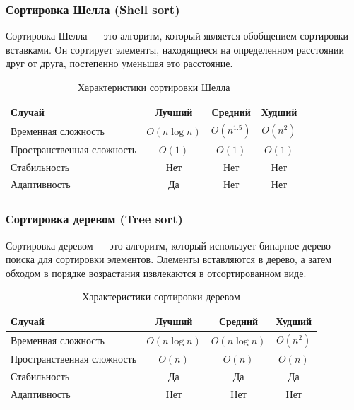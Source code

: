 \documentclass[a4paper,12pt]{article}
\begin{document}
\subsubsection{Сортировка Шелла (Shell sort)}
\label{subsubsec:сортировка-шелла-shell-sort}

Сортировка Шелла --- это алгоритм, который является обобщением сортировки вставками. Он сортирует элементы, находящиеся на определенном расстоянии друг от друга, постепенно уменьшая это расстояние.

\begin{table}[H]
    \centering
    \begin{tabular}{|l|c|c|c|}
        \hline
        Случай & Лучший & Средний & Худший \\
        \hline
        Временная сложность & $O(n \log n)$ & $O(n^{1.5})$ & $O(n^2)$ \\
        \hline
        Пространственная сложность & $O(1)$ & $O(1)$ & $O(1)$ \\
        \hline
        Стабильность & Нет & Нет & Нет \\
        \hline
        Адаптивность & Да & Нет & Нет \\
        \hline
    \end{tabular}
    \caption{Характеристики сортировки Шелла}
\end{table}

\subsubsection{Сортировка деревом (Tree sort)}
\label{subsubsec:сортировка-деревом-tree-sort}

Сортировка деревом --- это алгоритм, который использует бинарное дерево поиска для сортировки элементов. Элементы вставляются в дерево, а затем обходом в порядке возрастания извлекаются в отсортированном виде.

\begin{table}[H]
    \centering
    \begin{tabular}{|l|c|c|c|}
        \hline
        Случай & Лучший & Средний & Худший \\
        \hline
        Временная сложность & $O(n \log n)$ & $O(n \log n)$ & $O(n^2)$ \\
        \hline
        Пространственная сложность & $O(n)$ & $O(n)$ & $O(n)$ \\
        \hline
        Стабильность & Да & Да & Да \\
        \hline
        Адаптивность & Нет & Нет & Нет \\
        \hline
    \end{tabular}
    \caption{Характеристики сортировки деревом}
\end{table}
\end{document}
